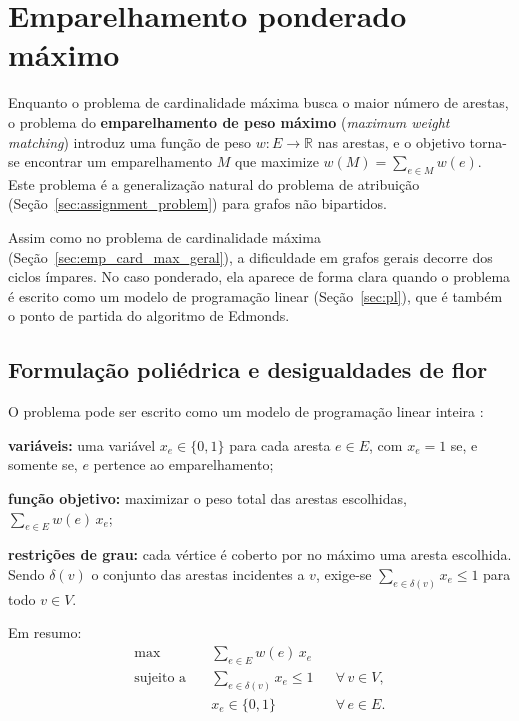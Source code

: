 \section{Emparelhamento ponderado máximo}
\label{sec:emp_pond_max}

Enquanto o problema de cardinalidade máxima busca o maior número de arestas, o problema do \textbf{emparelhamento de peso máximo} (\textit{maximum weight matching}) introduz uma função de peso $w: E \to \mathbb{R}$ nas arestas, e o objetivo torna-se encontrar um emparelhamento $M$ que maximize $w(M) = \sum_{e \in M} w(e)$. Este problema é a generalização natural do problema de atribuição (Seção~\ref{sec:assignment_problem}) para grafos não bipartidos.

Assim como no problema de cardinalidade máxima (Seção~\ref{sec:emp_card_max_geral}), a dificuldade em grafos gerais decorre dos ciclos ímpares. No caso ponderado, ela aparece de forma clara quando o problema é escrito como um modelo de programação linear (Seção~\ref{sec:pl}), que é também o ponto de partida do algoritmo de Edmonds.

\subsection{Formulação poliédrica e desigualdades de flor}
\label{sec:formulacao_poliedrica}

O problema pode ser escrito como um modelo de programação linear inteira \cite{schrijver}:
\begin{alineas}
    \item \textbf{variáveis:} uma variável $x_e \in \{0, 1\}$ para cada aresta $e \in E$, com $x_e = 1$ se, e somente se, $e$ pertence ao emparelhamento;
    \item \textbf{função objetivo:} maximizar o peso total das arestas escolhidas, $\sum_{e \in E} w(e)\, x_e$;
    \item \textbf{restrições de grau:} cada vértice é coberto por no máximo uma aresta escolhida. Sendo $\delta(v)$ o conjunto das arestas incidentes a $v$, exige-se $\sum_{e \in \delta(v)} x_e \le 1$ para todo $v \in V$.
\end{alineas}
Em resumo:
\begin{equation}
    \begin{aligned}
        \max \quad & \sum_{e \in E} w(e)\, x_e \\
        \text{sujeito a} \quad & \sum_{e \in \delta(v)} x_e \le 1 && \forall\, v \in V, \\
        & x_e \in \{0, 1\} && \forall\, e \in E.
    \end{aligned}
    \label{eq:emp_pli}
\end{equation}

